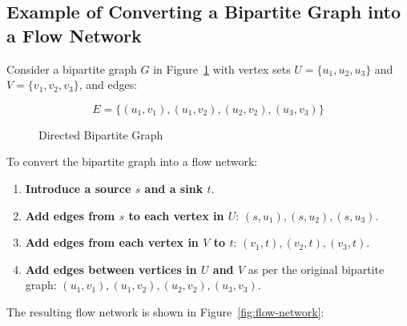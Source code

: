 \subsection{Example of Converting a Bipartite Graph into a Flow Network}

Consider a bipartite graph \( G \) in Figure~\ref{fig:bipartite-graph} with vertex sets \( U = \{u_1, u_2, u_3\} \) and \( V = \{v_1, v_2, v_3\} \), and edges:

\[
E = \{(u_1, v_1), (u_1, v_2), (u_2, v_2), (u_3, v_3)\}
\]

\begin{figure}[h]
    \centering
    \caption{Directed Bipartite Graph}
    \label{fig:bipartite-graph}
\end{figure}

To convert the bipartite graph into a flow network:

\begin{enumerate}
    \item \textbf{Introduce a source \( s \) and a sink \( t \)}.
    \item \textbf{Add edges from \( s \) to each vertex in \( U \)}: \( (s, u_1), (s, u_2), (s, u_3) \).
    \item \textbf{Add edges from each vertex in \( V \) to \( t \)}: \( (v_1, t), (v_2, t), (v_3, t) \).
    \item \textbf{Add edges between vertices in \( U \) and \( V \)} as per the original bipartite graph: \( (u_1, v_1), (u_1, v_2), (u_2, v_2), (u_3, v_3) \).
\end{enumerate}

The resulting flow network is shown in Figure~\ref{fig:flow-network}:

